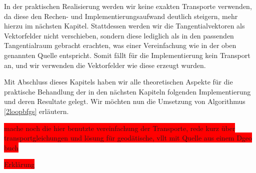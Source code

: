 In der praktischen Realisierung werden wir keine exakten Transporte verwenden, da diese den Rechen- und Implementierungsaufwand deutlich steigern, mehr hierzu im nächsten Kapitel. Stattdessen werden wir die Tangentialvektoren als Vektorfelder nicht verschieben, sondern diese lediglich als in den passenden Tangentialraum gebracht erachten, was einer Vereinfachung wie in der oben genannten Quelle entspricht. Somit fällt für die Implementierung kein Transport an, und wir verwenden die Vektorfelder wie diese erzeugt wurden. 

Mit Abschluss dieses Kapitels haben wir alle theoretischen Aspekte für die praktische Behandlung der in den nächsten Kapiteln folgenden Implementierung und deren Resultate gelegt. Wir möchten nun die Umsetzung von Algorithmus \ref{2loopbfgs} erläutern.

\colorbox{red}{mache noch die hier benutzte vereinfachung der Transporte, rede kurz über transportgleichungen und lösung für geodätische, vllt mit Quelle aus einem Dgeo buch}


\colorbox{red}{Erklärung}

